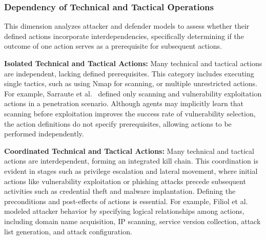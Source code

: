 
\subsubsection{Dependency of Technical and Tactical Operations}

This dimension analyzes attacker and defender models to assess whether their defined actions incorporate interdependencies, specifically determining if the outcome of one action serves as a prerequisite for subsequent actions.

\textbf{Isolated Technical and Tactical Actions:} Many technical and tactical actions are independent, lacking defined prerequisites. This category includes executing single tactics, such as using Nmap for scanning, or multiple unrestricted actions.
For example, Sarraute et al.~\cite{sarraute2013penetration} defined only scanning and vulnerability exploitation actions in a penetration scenario. Although agents may implicitly learn that scanning before exploitation improves the success rate of vulnerability selection, the action definitions do not specify prerequisites, allowing actions to be performed independently.
 

\textbf{Coordinated Technical and Tactical Actions:} Many technical and tactical actions are interdependent, forming an integrated kill chain. 
This coordination is evident in stages such as privilege escalation and lateral movement, where initial actions like vulnerability exploitation or phishing attacks precede subsequent activities such as credential theft and malware implantation. Defining the preconditions and post-effects of actions is essential. For example, Filiol et al.~\cite{filiol2021method} modeled attacker behavior by specifying logical relationships among actions, including domain name acquisition, IP scanning, service version collection, attack list generation, and attack configuration.

